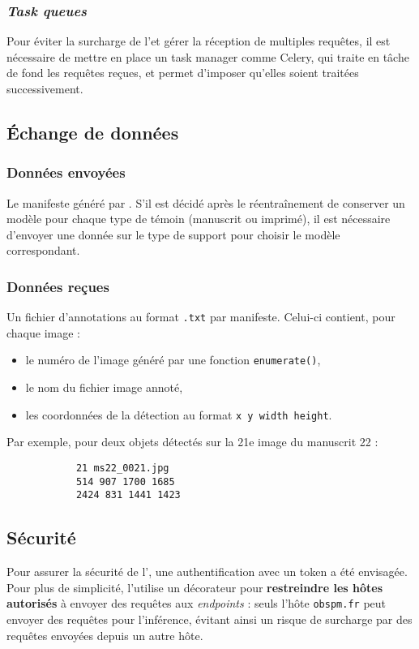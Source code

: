 		\subsubsection{\textit{Task queues}}
		Pour éviter la surcharge de l’\api et gérer la réception de multiples requêtes, il est nécessaire de mettre en place un task manager comme Celery, qui traite en tâche de fond les requêtes reçues, et permet d’imposer qu’elles soient traitées successivement. 
		
	\subsection{Échange de données}
		\subsubsection{Données envoyées}
		Le manifeste \iiif généré par \eida. 
		S’il est décidé après le réentraînement de conserver un modèle pour chaque type de témoin (manuscrit ou imprimé), il est nécessaire d’envoyer une donnée sur le type de support pour choisir le modèle correspondant.
		\subsubsection{Données reçues}
		Un fichier d’annotations au format \texttt{.txt} par manifeste. Celui-ci contient, pour chaque image :
		\begin{itemize}
			\item le numéro de l’image généré par une fonction \texttt{enumerate()},
			\item le nom du fichier image annoté, 
			\item les coordonnées de la détection au format \texttt{x y width height}.
		\end{itemize}

		Par exemple, pour deux objets détectés sur la 21e image du manuscrit 22 :
		\begin{lstlisting}
			21 ms22_0021.jpg
			514 907 1700 1685
			2424 831 1441 1423\end{lstlisting}

	\subsection{Sécurité}
	Pour assurer la sécurité de l’\api, une authentification avec un token a été envisagée. Pour plus de simplicité, l’\api utilise un décorateur pour \textbf{restreindre les hôtes autorisés} à envoyer des requêtes aux \textit{endpoints} : seuls l’hôte \texttt{obspm.fr} peut envoyer des requêtes pour l’inférence, évitant ainsi un risque de surcharge par des requêtes envoyées depuis un autre hôte.
	
